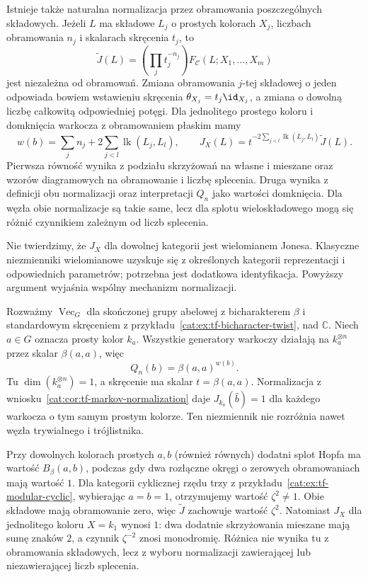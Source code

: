 Istnieje także naturalna normalizacja przez obramowania poszczególnych składowych. Jeżeli $L$ ma składowe $L_j$ o prostych kolorach $X_j$, liczbach obramowania $n_j$ i skalarach skręcenia $t_j$, to
\[
 \widetilde J(L)=\left(\prod_j t_j^{-n_j}\right)
 F_{\mathcal C}(L;X_1,\ldots,X_m)
\]
jest niezależna od obramowań. Zmiana obramowania $j$-tej składowej o jeden odpowiada bowiem wstawieniu skręcenia $\theta_{X_j}=t_j\id_{X_j}$, a zmiana o dowolną liczbę całkowitą odpowiedniej potęgi. Dla jednolitego prostego koloru i domknięcia warkocza z obramowaniem płaskim mamy
\[
 w(b)=\sum_j n_j+2\sum_{j<l}\operatorname{lk}(L_j,L_l),
 \qquad
 J_X(L)=t^{-2\sum_{j<l}\operatorname{lk}(L_j,L_l)}
 \widetilde J(L).
\]
Pierwsza równość wynika z podziału skrzyżowań na własne i mieszane oraz wzorów diagramowych na obramowanie i liczbę splecenia. Druga wynika z definicji obu normalizacji oraz interpretacji $Q_n$ jako wartości domknięcia. Dla węzła obie normalizacje są takie same, lecz dla splotu wieloskładowego mogą się różnić czynnikiem zależnym od liczb splecenia.

Nie twierdzimy, że $J_X$ dla dowolnej kategorii jest wielomianem Jonesa. Klasyczne niezmienniki wielomianowe uzyskuje się z określonych kategorii reprezentacji i odpowiednich parametrów; potrzebna jest dodatkowa identyfikacja. Powyższy argument wyjaśnia wspólny mechanizm normalizacji.

\begin{przyklad}\label{cat:ex:tf-rt-pointed}
Rozważmy $\operatorname{Vec}_G$ dla skończonej grupy abelowej z bicharakterem $\beta$ i standardowym skręceniem z przykładu~\ref{cat:ex:tf-bicharacter-twist}, nad $\mathbb C$. Niech $a\in G$ oznacza prosty kolor $k_a$. Wszystkie generatory warkoczy działają na $k_a^{\otimes n}$ przez skalar $\beta(a,a)$, więc
\[
 Q_n(b)=\beta(a,a)^{w(b)}.
\]
Tu $\dim(k_a^{\otimes n})=1$, a skręcenie ma skalar $t=\beta(a,a)$. Normalizacja z wniosku~\ref{cat:cor:tf-markov-normalization} daje $J_{k_a}(\widehat b)=1$ dla każdego warkocza o tym samym prostym kolorze. Ten niezmiennik nie rozróżnia nawet węzła trywialnego i trójlistnika.

Przy dowolnych kolorach prostych $a,b$ (również równych) dodatni splot Hopfa ma wartość $B_\beta(a,b)$, podczas gdy dwa rozłączne okręgi o zerowych obramowaniach mają wartość $1$. Dla kategorii cyklicznej rzędu trzy z przykładu~\ref{cat:ex:tf-modular-cyclic}, wybierając $a=b=1$, otrzymujemy wartość $\zeta^2\neq1$. Obie składowe mają obramowanie zero, więc $\widetilde J$ zachowuje wartość $\zeta^2$. Natomiast $J_X$ dla jednolitego koloru $X=k_1$ wynosi $1$: dwa dodatnie skrzyżowania mieszane mają sumę znaków $2$, a czynnik $\zeta^{-2}$ znosi monodromię. Różnica nie wynika tu z obramowania składowych, lecz z wyboru normalizacji zawierającej lub niezawierającej liczb splecenia.
\end{przyklad}

